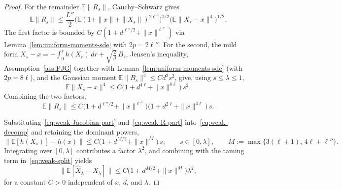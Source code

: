 \documentclass[11pt,a4paper,reqno]{amsart}
\theoremstyle{plain}
\theoremstyle{definition}
\theoremstyle{remark}
\newcommand{\E}{\mathbb{E}}
\begin{document}
\begin{proof}
For the remainder $\E\|R_s\|$, Cauchy--Schwarz gives
\[
  \E\|R_s\|
  \le
  \frac{L''}{2}
  \bigl(\E(1+\|x\|+\|X_s\|)^{2\ell''}\bigr)^{1/2}
  \bigl(\E\|X_s-x\|^{4}\bigr)^{1/2}.
\]
The first factor is bounded by $C(1+d^{\ell''/2}+\|x\|^{\ell''})$ via
Lemma~\ref{lem:uniform-moments-sde} with $2p=2\ell''$. For the second, the mild
form $X_s-x=-\int_0^s h(X_r)\,dr+\sqrt{\frac{2}{\beta}}\,B_s$, Jensen's inequality,
Assumption~\ref{ass:PJG} together with
Lemma~\ref{lem:uniform-moments-sde} (with $2p=8\ell$), and the Gaussian moment
$\E\|B_s\|^4\le Cd^2s^2$, give, using $s\le\lambda\le1$,
\[
  \E\|X_s-x\|^4
  \le
  C\bigl(1+d^{4\ell}+\|x\|^{8\ell}\bigr)\,s^2.
\]
Combining the two factors,
\begin{equation}\label{eq:weak-R-part}
  \E\|R_s\|
  \le
  C\bigl(1+d^{\ell''/2}+\|x\|^{\ell''}\bigr)
   \bigl(1+d^{2\ell}+\|x\|^{4\ell}\bigr)\,s.
\end{equation}

Substituting~\eqref{eq:weak-Jacobian-part} and~\eqref{eq:weak-R-part}
into~\eqref{eq:weak-decomp} and retaining the dominant powers,
\[
  \|\E[h(X_s)]-h(x)\|
  \le
  C\bigl(1+d^{M/2}+\|x\|^{M}\bigr)\,s,
  \qquad s\in[0,\lambda],
  \qquad
  M:=\max\{3(\ell+1),\,4\ell+\ell''\}.
\]
Integrating over $[0,\lambda]$ contributes a factor $\lambda^2$, and combining
with the taming term in~\eqref{eq:weak-split} yields
\[
  \bigl\|\E[\widehat X_\lambda-X_\lambda]\bigr\|
  \le
  C\bigl(1+d^{M/2}+\|x\|^{M}\bigr)\lambda^2,
\]
for a constant $C>0$ independent of $x$, $d$, and $\lambda$.
\end{proof}
\end{document}
